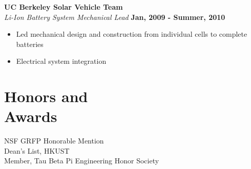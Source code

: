 \documentclass[margin,line]{resume}
\begin{document}
\begin{resume}

    \textbf{UC Berkeley Solar Vehicle Team}\\
    \textsl{Li-Ion Battery System Mechanical Lead} \hfill \textbf{Jan, 2009 - Summer, 2010}\\ \vspace{-4mm}
    \begin{itemize} \itemsep -2pt
    	\item Led mechanical design and construction from individual cells to complete batteries
    	\item Electrical system integration
    \end{itemize} \vspace{-2.25mm}

    \section{\mysidestyle Honors and\\Awards}

    NSF GRFP Honorable Mention                    \\
    Dean's List, HKUST \vspace{1mm}               \\
    Member, Tau Beta Pi Engineering Honor Society \\

\begin{comment}
    \section{\mysidestyle Relevant Undergraduate Coursework}


\end{comment}
\end{resume}
\end{document}
